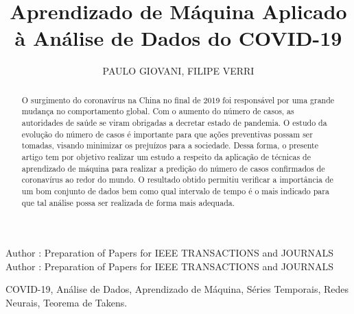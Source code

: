\documentclass{ieeeaccess}
\begin{document}
%
\title{Aprendizado de Máquina Aplicado à Análise de Dados do COVID-19}
\author{
	\uppercase{Paulo Giovani},	
	\uppercase{Filipe Verri}
}

\address[1]{Instituto Federal de Educação, Ciência e Tecnologia de São Paulo (IFSP), Campos do Jordão, Brasil  (e-mail: paulogiovani@ifsp.edu.br)}
\address[2]{Divisão de Ciência da Computacão (IEC), Instituto de Tecnologia Aeronáutica (ITA), São José dos Campos, Brasil (e-mail: verri@ita.br)}


\markboth
{Author \headeretal: Preparation of Papers for IEEE TRANSACTIONS and JOURNALS}
{Author \headeretal: Preparation of Papers for IEEE TRANSACTIONS and JOURNALS}

 
\begin{abstract}

O surgimento do coronavírus na China no final de 2019 foi responsável por uma grande mudança no comportamento global. Com o aumento do número de casos, as autoridades de saúde se viram obrigadas a decretar estado de pandemia. O estudo da evolução do número de casos é importante para que ações preventivas possam ser tomadas, visando minimizar os prejuízos para a sociedade. Dessa forma, o presente artigo tem por objetivo realizar um estudo a respeito da aplicação de técnicas de aprendizado de máquina para realizar a predição do número de casos confirmados de coronavírus ao redor do mundo. O resultado obtido permitiu verificar a importância de um bom conjunto de dados bem como qual intervalo de tempo é o mais indicado para que tal análise possa ser realizada de forma mais adequada.

\end{abstract}

\begin{keywords}
COVID-19, Análise de Dados, Aprendizado de Máquina, Séries Temporais, Redes Neurais, Teorema de Takens.
\end{keywords}
\end{document}
